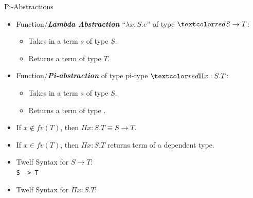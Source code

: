 \documentclass{beamer}
\renewcommand{\emph}[1]{\textbf{\textit{#1}}}
\begin{document}
\begin{frame}{Pi-Abstractions}
\begin{itemize}
\item  Function/\emph{Lambda Abstraction} ``$\lambda x:S.e$'' of type
$\cemph{S \rightarrow T}$:
  \begin{itemize}
  \item Takes in a term $s$ of type $S$.
  \item Returns a term of type $T$.
  \end{itemize}

\pause
\item Function/\emph{Pi-abstraction} of type pi-type $\cemph{\Pi x:S.T}$:
  \begin{itemize}
  \item Takes in a term $s$ of type $S$.
  \item Returns a term of type .
  \end{itemize}

\pause
\item If $x \notin \mathit{fv}(T)$, then $\Pi x:S.T \equiv S \rightarrow T$.

\pause
\item If $x \in \mathit{fv}(T)$, then $\Pi x:S.T$ returns term of a
dependent type.

\pause
\item Twelf Syntax for $S \rightarrow T$: \\
\texttt{S -> T}

\pause
\item Twelf Syntax for $\Pi x:S.T$: \\
\end{itemize}
\end{frame}
\end{document}
